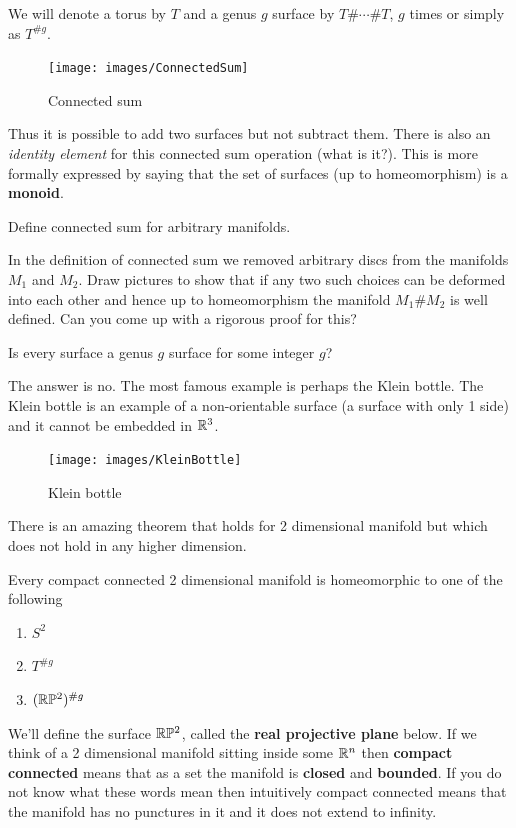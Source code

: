 We will denote a torus by $T$ and a genus $g$ surface by $T \# \cdots \# T$, $g$ times or simply as $T^{\#g}$.

\begin{figure}[h]
	\centering \texttt{[image: images/ConnectedSum]}
	\caption{Connected sum}
\end{figure}

Thus it is possible to add two surfaces but not subtract them. There is also an \emph{identity element} for this connected sum operation (what is it?). This is more formally expressed by saying that the set of surfaces (up to homeomorphism) is a \textbf{monoid}.

\begin{exercise}
	Define connected sum for arbitrary manifolds.
\end{exercise}

\begin{exercise}
	In the definition of connected sum we removed arbitrary discs from the manifolds $M_1$ and $M_2$. Draw pictures to show that if any two such choices can be deformed into each other and hence up to homeomorphism the manifold $M_1 \# M_2$ is well defined. Can you come up with a rigorous proof for this?
\end{exercise}

\begin{ques}
	Is every surface a genus $g$ surface for some integer $g$?
\end{ques}
The answer is no. The most famous example is perhaps the Klein bottle. The Klein bottle is an example of a non-orientable surface (a surface with only 1 side) and it cannot be embedded in $\mathbb{R}^3$.
\begin{figure}[H]
	\centering
	\texttt{[image: images/KleinBottle]}
	\caption{Klein bottle}
\end{figure}

There is an amazing theorem that holds for 2 dimensional manifold but which does not hold in any higher dimension.

\begin{thm}
	Every compact connected 2 dimensional manifold is homeomorphic to one of the following
	\begin{enumerate}
		\item $S^2$
		\item $T^{\#g}$
		\item $(\mathbb{R}\mathbb{P}^2)^{\#g}$
	\end{enumerate}
\end{thm}
We'll define the surface $\mathbb{R}\mathbb{P}^2$, called the \textbf{real projective plane} below. If we think of a 2 dimensional manifold sitting inside some $\mathbb{R}^n$ then \textbf{compact connected} means that as a set the manifold is \textbf{closed} and \textbf{bounded}. If you do not know what these words mean then intuitively compact connected means that the manifold has no punctures in it and it does not extend to infinity.

